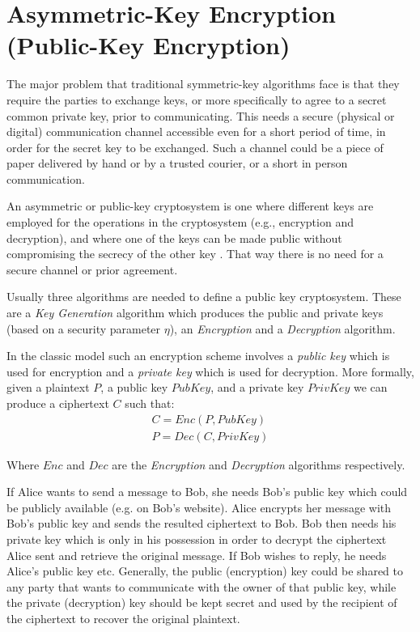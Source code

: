 \section{Asymmetric-Key Encryption (Public-Key Encryption)}\label{s:public-key-encryption}
The major problem that traditional symmetric-key algorithms face is that they require the parties to exchange keys, or more specifically to agree to a secret common private key, prior to communicating.
This needs a secure (physical or digital) communication channel accessible even for a short period of time, in order for the secret key to be exchanged. Such a channel could be a piece of paper delivered by hand or by a trusted courier, or a short in person communication.

An asymmetric or public-key cryptosystem is one where different keys are employed for the operations in the cryptosystem (e.g., encryption and decryption), and where one of the keys can be made public without compromising the secrecy of the other key \cite{Kaliski2011}. That way there is no need for a secure channel or prior agreement.

Usually three algorithms are needed to define a public key cryptosystem. These are a \textit{Key Generation} algorithm which produces the public and private keys (based on a security parameter $\eta$), an \textit{Encryption} and a \textit{Decryption} algorithm.

In the classic model such an encryption scheme involves a \textit{public key} which is used for encryption and a \textit{private key} which is used for decryption.
More formally, given a plaintext $P$, a public key $PubKey$, and a private key $PrivKey$ we can produce a ciphertext $C$ such that:
\begin{equation}
  \label{eq:public-key-encryption}
  \begin{aligned}
    C = Enc(P, PubKey)\\
    P = Dec(C, PrivKey)
  \end{aligned}
  \end{equation}

Where $Enc$ and $Dec$ are the \textit{Encryption} and \textit{Decryption} algorithms respectively.

If Alice wants to send a message to Bob, she needs Bob's public key which could be publicly available (e.g. on Bob's website).
Alice encrypts her message with Bob's public key and sends the resulted ciphertext to Bob. Bob then needs his private key which is only in his possession in order to decrypt the ciphertext Alice sent and retrieve the original message.
If Bob wishes to reply, he needs Alice's public key etc.
Generally, the public (encryption) key could be shared to any party that wants to communicate with the owner of that public key, while the private (decryption) key should be kept secret and used by the recipient of the ciphertext to recover the original plaintext.

